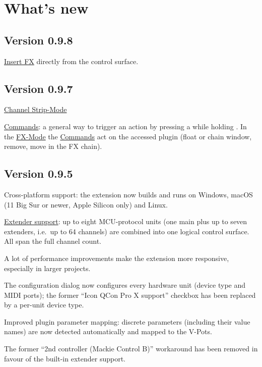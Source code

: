 \section{What's new}\label{whatsnew}

\subsection{Version 0.9.8}
\begin{compactitem}
\item \hyperref[pluginsertcategories]{Insert FX} directly from the control
  surface.
\end{compactitem}

\subsection{Version 0.9.7}
\begin{compactitem}
\item \hyperref[channelstrip]{Channel Strip-Mode}
\item \hyperref[commands]{Commands}: a general way to trigger an action by
  pressing a \vpot while holding \control. In the \hyperref[plugmode]{FX-Mode}
  the \hyperref[plugcommands]{Commands} act on the accessed plugin (float or
  chain window, remove, move in the FX chain).
\end{compactitem}


\subsection{Version 0.9.5}
\begin{compactitem}
\item Cross-platform support: the extension now builds and runs on
  Windows, macOS\,(11 Big Sur or newer, Apple Silicon only) and Linux.
\item \hyperref[units]{Extender support}: up to eight MCU-protocol units (one
  main plus up to seven extenders, i.e.\ up to 64 channels) are combined
  into one logical control surface. All \fsm span the full
  channel count.
\item A lot of performance improvements make the extension more responsive,
  especially in larger projects.
\item The configuration dialog now configures every hardware unit (device
  type and MIDI ports); the former ``Icon QCon Pro X support'' checkbox has
  been replaced by a per-unit device type.
\item Improved plugin parameter mapping: discrete parameters (including
  their value names) are now detected automatically and mapped to the
  V-Pots.
\item The former ``2nd controller (Mackie Control B)'' workaround has been
  removed in favour of the built-in extender support.
\end{compactitem}

